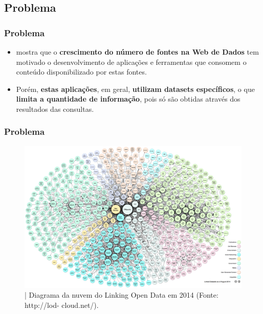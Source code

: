 \documentclass[hyperref={pdfpagelabels=false}]{beamer}
\begin{document}
\subsection{Problema}
 
\begin{frame}
	\frametitle{Problema}	
		\begin{itemize}
	\item \cite{tavares2015} mostra que o \textbf{crescimento do número de fontes na Web de Dados} tem motivado o desenvolvimento de aplicações e ferramentas que consomem o conteúdo disponibilizado por estas fontes. 
    \item Porém, \textbf{estas aplicações}, em geral, \textbf{utilizam datasets específicos}, o que \textbf{limita a quantidade de informação}, pois só são obtidas através dos resultados das consultas.      
    
	\end{itemize}		
\end{frame}
 
\begin{frame}
	\frametitle{Problema}
	\begin{figure}[h]
	\centering
		\includegraphics[scale=0.2]{img/lod-cloud_colored_1000px}
	\caption{| Diagrama da nuvem do Linking Open Data em 2014 (Fonte: http://lod- cloud.net/).}
	\label{fig:lod-cloud_colored_1000px}
\end{figure}	
\end{frame}
\end{document}
